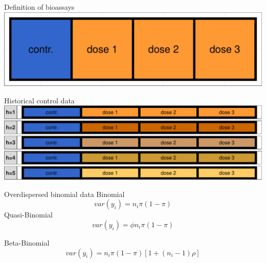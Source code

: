 \documentclass[
  ignorenonframetext,
]{beamer}
\begin{document}
\begin{frame}{Definition of bioassays}
\protect\hypertarget{definition-of-bioassays}{}
\includegraphics{presentation_files/figure-beamer/unnamed-chunk-1-1.pdf}
\end{frame}

\begin{frame}{Historical control data}
\protect\hypertarget{historical-control-data}{}
\includegraphics{presentation_files/figure-beamer/unnamed-chunk-2-1.pdf}
\end{frame}

\begin{frame}{}
\protect\hypertarget{section-1}{}
\end{frame}

\begin{frame}{Overdispersed binomial data}
\protect\hypertarget{overdispersed-binomial-data}{}
Binomial \[ var(y_i)= n_i \pi (1 - \pi) \] Quasi-Binomial
\[ var(y_i)= \phi n_i \pi (1-\pi)\]

Beta-Binomial \[ var(y_i)= n_i \pi (1 - \pi) [1+ (n_i-1)\rho]\]
\end{frame}
\end{document}

